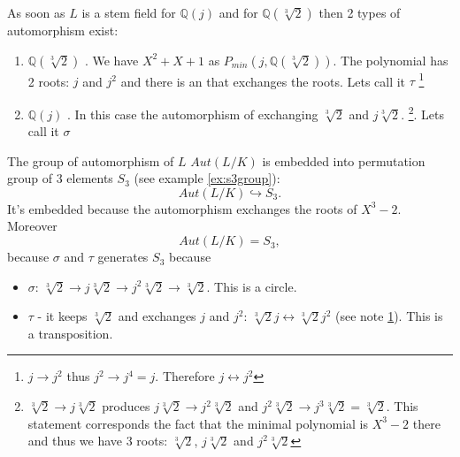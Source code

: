 \begin{example}
  
  As soon as $L$ is a stem field for $\mathbb{Q}\left(j\right)$ 
  and for $\mathbb{Q}\left(\sqrt[3]{2}\right)$ then 2 types of
  automorphism exist:
  \begin{enumerate}
    \item $\mathbb{Q}\left(\sqrt[3]{2}\right)$
      . We have
      $X^2+X+1$ as
      $P_{min}\left(j, \mathbb{Q}\left(\sqrt[3]{2}\right)\right)$. The
      polynomial has 2 roots: $j$ and $j^2$ and there is an
       that exchanges the roots. Lets call it
      $\tau$
      \footnote{
        \label{note:lec2_example_j}
        $j \to j^2$ thus $j^2 \to j^4 = j$. Therefore $j
        \leftrightarrow j^2$
      }
      \item $\mathbb{Q}\left(j\right)$ . In
        this case the automorphism of exchanging $\sqrt[3]{2}$ and
        $j \sqrt[3]{2}$. \footnote{
          $\sqrt[3]{2} \to j \sqrt[3]{2}$ produces
          $j\sqrt[3]{2} \to j^2 \sqrt[3]{2}$ and
          $j^2 \sqrt[3]{2} \to j^3\sqrt[3]{2} = \sqrt[3]{2}$. This statement
          corresponds the fact that
          the minimal polynomial is $X^3 - 2$ there and thus we
          have 3 roots: $\sqrt[3]{2}$, $j \sqrt[3]{2}$ and $j^2
          \sqrt[3]{2}$ 
        }. Lets call it $\sigma$
  \end{enumerate}

  The group of automorphism of $L$ $Aut\left(L/K\right)$ is embedded
  into permutation group of 3 elements $S_3$ (see example \ref{ex:s3group}):
  \[
  Aut\left(L/K\right) \hookrightarrow S_3.
  \]
  It's embedded because the automorphism exchanges the roots of
  $X^3-2$. Moreover
  \[
  Aut\left(L/K\right) = S_3,
  \]
  because $\sigma$ and $\tau$ generates $S_3$ because
  \begin{itemize}
  \item $\sigma$: $\sqrt[3]{2} \to j \sqrt[3]{2} \to j^2 \sqrt[3]{2}
    \to \sqrt[3]{2}$. This is a circle.
  \item $\tau$ - it keeps $\sqrt[3]{2}$ and exchanges $j$ and $j^2$:
    $\sqrt[3]{2} j \leftrightarrow \sqrt[3]{2} j^2$ (see note
    \ref{note:lec2_example_j}).  This is a
    transposition. 
  \end{itemize}


\end{example}
